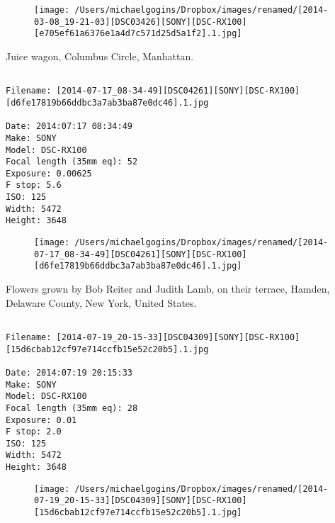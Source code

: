 \begin{figure}
\texttt{[image: /Users/michaelgogins/Dropbox/images/renamed/[2014-03-08\_19-21-03][DSC03426][SONY][DSC-RX100][e705ef61a6376e1a4d7c571d25d5a1f2].1.jpg]}
\end{figure}
    
\clearpage
\onecolumn
\noindent Juice wagon, Columbus Circle, Manhattan.
\noindent
\begin{lstlisting}

Filename: [2014-07-17_08-34-49][DSC04261][SONY][DSC-RX100][d6fe17819b66ddbc3a7ab3ba87e0dc46].1.jpg

Date: 2014:07:17 08:34:49
Make: SONY
Model: DSC-RX100
Focal length (35mm eq): 52
Exposure: 0.00625
F stop: 5.6
ISO: 125
Width: 5472
Height: 3648
\end{lstlisting}
\clearpage

\begin{figure}
\texttt{[image: /Users/michaelgogins/Dropbox/images/renamed/[2014-07-17\_08-34-49][DSC04261][SONY][DSC-RX100][d6fe17819b66ddbc3a7ab3ba87e0dc46].1.jpg]}
\end{figure}
    
\clearpage
\onecolumn
\noindent Flowers grown by Bob Reiter and Judith Lamb, on their terrace, Hamden, Delaware County, New York, United States.
\noindent
\begin{lstlisting}

Filename: [2014-07-19_20-15-33][DSC04309][SONY][DSC-RX100][15d6cbab12cf97e714ccfb15e52c20b5].1.jpg

Date: 2014:07:19 20:15:33
Make: SONY
Model: DSC-RX100
Focal length (35mm eq): 28
Exposure: 0.01
F stop: 2.0
ISO: 125
Width: 5472
Height: 3648
\end{lstlisting}
\clearpage

\begin{figure}
\texttt{[image: /Users/michaelgogins/Dropbox/images/renamed/[2014-07-19\_20-15-33][DSC04309][SONY][DSC-RX100][15d6cbab12cf97e714ccfb15e52c20b5].1.jpg]}
\end{figure}
    
